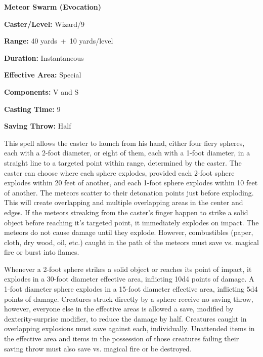 \begin{multicols}{2}
\vspace{1em}

\noindent
\begin{minipage}{\columnwidth}

\noindent \textbf{Meteor Swarm (Evocation)}

\noindent \textbf{Caster/Level:} Wizard/9

\noindent \textbf{Range:} 40 yards~+~10 yards/level

\noindent \textbf{Duration:} Instantaneous

\noindent \textbf{Effective Area:} Special

\noindent \textbf{Components:} V and S

\noindent \textbf{Casting Time:} 9

\noindent \textbf{Saving Throw:} Half

\end{minipage}

This spell allows the caster to launch from his hand, either four fiery spheres, each with a 2-foot diameter, or eight of them, each with a 1-foot diameter, in a straight line to a targeted point within range, determined by the caster.  The caster can choose where each sphere explodes, provided each 2-foot sphere explodes within 20 feet of another, and each 1-foot sphere explodes within 10 feet of another.  The meteors scatter to their detonation points just before exploding.  This will create overlapping and multiple overlapping areas in the center and edges.  If the meteors streaking from the caster's finger happen to strike a solid object before reaching it's targeted point, it immediately explodes on impact.  The meteors do not cause damage until they explode.  However, combustibles (paper, cloth, dry wood, oil, etc.) caught in the path of the meteors must save vs. magical fire or burst into flames.  

Whenever a 2-foot sphere strikes a solid object or reaches its point of impact, it explodes in a 30-foot diameter effective area, inflicting 10d4 points of damage.  A 1-foot diameter sphere explodes in a 15-foot diameter effective area, inflicting 5d4 points of damage.  Creatures struck directly by a sphere receive no saving throw, however, everyone else in the effective areas is allowed a save, modified by dexterity-surprise modifier, to reduce the damage by half.  Creatures caught in overlapping explosions must save against each, individually.  Unattended items in the effective area and items in the possession of those creatures failing their saving throw must also save vs. magical fire or be destroyed. 


\end{multicols}
